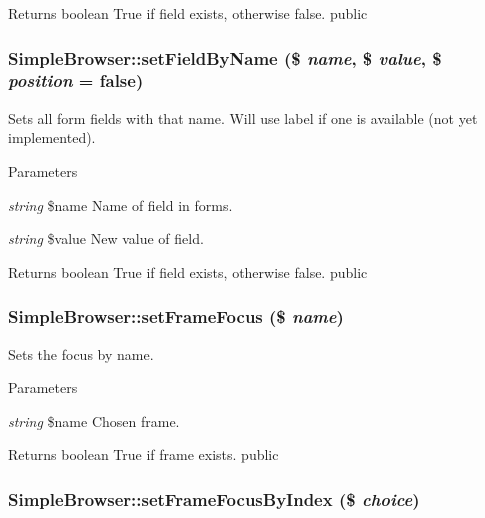 \begin{DoxyReturn}{Returns}
boolean True if field exists, otherwise false.  public 
\end{DoxyReturn}
\hypertarget{class_simple_browser_aa222b9fee2ab1bef430c1927d8da8b91}{
\subsubsection[{setFieldByName}]{\setlength{\rightskip}{0pt plus 5cm}SimpleBrowser::setFieldByName (\$ {\em name}, \/  \$ {\em value}, \/  \$ {\em position} = {\ttfamily false})}}
\label{class_simple_browser_aa222b9fee2ab1bef430c1927d8da8b91}
Sets all form fields with that name. Will use label if one is available (not yet implemented). 
\begin{DoxyParams}{Parameters}
\item[{\em string}]\$name Name of field in forms. \item[{\em string}]\$value New value of field. \end{DoxyParams}
\begin{DoxyReturn}{Returns}
boolean True if field exists, otherwise false.  public 
\end{DoxyReturn}
\hypertarget{class_simple_browser_ab7d90a4fb628f576addbec39d1ba26a7}{
\subsubsection[{setFrameFocus}]{\setlength{\rightskip}{0pt plus 5cm}SimpleBrowser::setFrameFocus (\$ {\em name})}}
\label{class_simple_browser_ab7d90a4fb628f576addbec39d1ba26a7}
Sets the focus by name. 
\begin{DoxyParams}{Parameters}
\item[{\em string}]\$name Chosen frame. \end{DoxyParams}
\begin{DoxyReturn}{Returns}
boolean True if frame exists.  public 
\end{DoxyReturn}
\hypertarget{class_simple_browser_a942e65249c816e9eb63d068f41e516f7}{
\subsubsection[{setFrameFocusByIndex}]{\setlength{\rightskip}{0pt plus 5cm}SimpleBrowser::setFrameFocusByIndex (\$ {\em choice})}}
